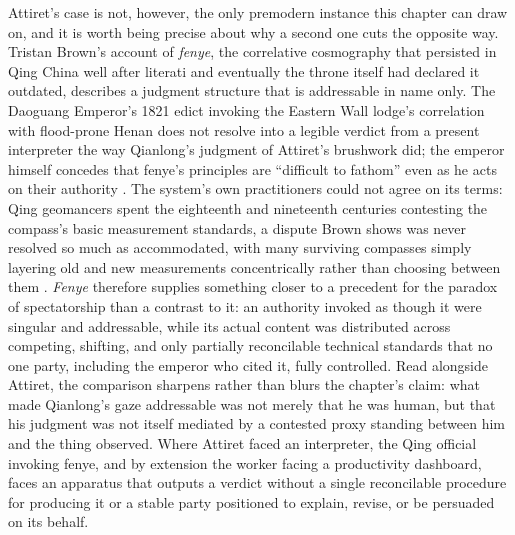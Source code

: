 \documentclass[10pt]{article}
\begin{document}
Attiret's case is not, however, the only premodern instance this chapter can draw on, and it is worth being precise about why a second one cuts the opposite way. Tristan Brown's account of \emph{fenye}, the correlative cosmography that persisted in Qing China well after literati and eventually the throne itself had declared it outdated, describes a judgment structure that is addressable in name only. The Daoguang Emperor's 1821 edict invoking the Eastern Wall lodge's correlation with flood-prone Henan does not resolve into a legible verdict from a present interpreter the way Qianlong's judgment of Attiret's brushwork did; the emperor himself concedes that fenye's principles are ``difficult to fathom'' even as he acts on their authority \cite{brown}. The system's own practitioners could not agree on its terms: Qing geomancers spent the eighteenth and nineteenth centuries contesting the compass's basic measurement standards, a dispute Brown shows was never resolved so much as accommodated, with many surviving compasses simply layering old and new measurements concentrically rather than choosing between them \cite{brown}. \emph{Fenye} therefore supplies something closer to a precedent for the paradox of spectatorship than a contrast to it: an authority invoked as though it were singular and addressable, while its actual content was distributed across competing, shifting, and only partially reconcilable technical standards that no one party, including the emperor who cited it, fully controlled. Read alongside Attiret, the comparison sharpens rather than blurs the chapter's claim: what made Qianlong's gaze addressable was not merely that he was human, but that his judgment was not itself mediated by a contested proxy standing between him and the thing observed. Where Attiret faced an interpreter, the Qing official invoking fenye, and by extension the worker facing a productivity dashboard, faces an apparatus that outputs a verdict without a single reconcilable procedure for producing it or a stable party positioned to explain, revise, or be persuaded on its behalf.
\end{document}
